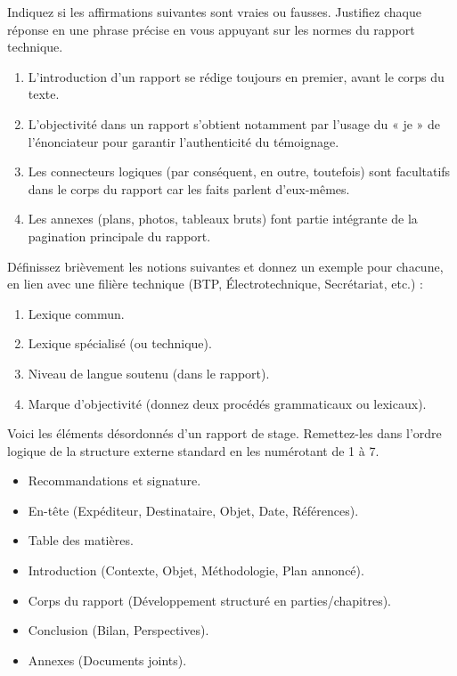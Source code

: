 \documentclass[11pt]{article}
\begin{document}
\begin{exercice}
Indiquez si les affirmations suivantes sont vraies ou fausses. Justifiez chaque réponse en une phrase précise en vous appuyant sur les normes du rapport technique.
\begin{enumerate}
\item L'introduction d'un rapport se rédige toujours en premier, avant le corps du texte.
\item L'objectivité dans un rapport s'obtient notamment par l'usage du « je » de l'énonciateur pour garantir l'authenticité du témoignage.
\item Les connecteurs logiques (par conséquent, en outre, toutefois) sont facultatifs dans le corps du rapport car les faits parlent d'eux-mêmes.
\item Les annexes (plans, photos, tableaux bruts) font partie intégrante de la pagination principale du rapport.
\end{enumerate}
\end{exercice}

\begin{exercice}
Définissez brièvement les notions suivantes et donnez un exemple pour chacune, en lien avec une filière technique (BTP, Électrotechnique, Secrétariat, etc.) :
\begin{enumerate}
\item Lexique commun.
\item Lexique spécialisé (ou technique).
\item Niveau de langue soutenu (dans le rapport).
\item Marque d'objectivité (donnez deux procédés grammaticaux ou lexicaux).
\end{enumerate}
\end{exercice}

\begin{exercice}
Voici les éléments désordonnés d'un rapport de stage. Remettez-les dans l'ordre logique de la structure externe standard en les numérotant de 1 à 7.
\begin{itemize}
\item[A.] Recommandations et signature.
\item[B.] En-tête (Expéditeur, Destinataire, Objet, Date, Références).
\item[C.] Table des matières.
\item[D.] Introduction (Contexte, Objet, Méthodologie, Plan annoncé).
\item[E.] Corps du rapport (Développement structuré en parties/chapitres).
\item[F.] Conclusion (Bilan, Perspectives).
\item[G.] Annexes (Documents joints).
\end{itemize}
\end{exercice}
\end{document}
